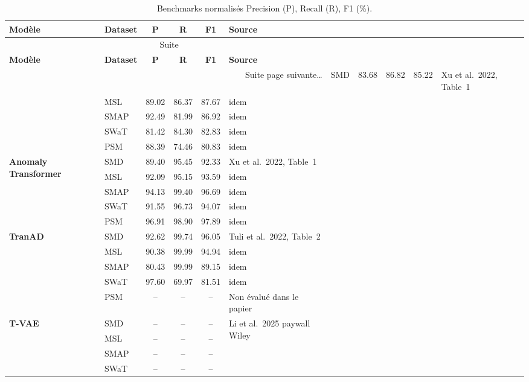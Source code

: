 \documentclass[12pt,a4paper]{article}
\newcommand{\nd}{--}
\begin{document}
\begin{landscape}
\begin{longtable}{llcccl}
\caption{Benchmarks normalisés  Precision (P), Recall (R), F1 (\%).}
\label{tab:benchmarks}\\
\toprule
\textbf{Modèle} & \textbf{Dataset} & \textbf{P} & \textbf{R} &
\textbf{F1} & \textbf{Source} \\
\midrule
\endfirsthead
\multicolumn{6}{c}{\tablename~\thetable{}  Suite}\\
\toprule
\textbf{Modèle} & \textbf{Dataset} & \textbf{P} & \textbf{R} &
\textbf{F1} & \textbf{Source} \\
\midrule
\endhead
\midrule\multicolumn{6}{r}{Suite page suivante\ldots}\endfoot
\bottomrule\endlastfoot

\multirow{5}{*}{\textbf{OmniAnomaly}}
 & SMD  & 83.68 & 86.82 & 85.22 & Xu et al.\ 2022, Table~1 \\
 & MSL  & 89.02 & 86.37 & 87.67 & idem \\
 & SMAP & 92.49 & 81.99 & 86.92 & idem \\
 & SWaT & 81.42 & 84.30 & 82.83 & idem \\
 & PSM  & 88.39 & 74.46 & 80.83 & idem \\
\midrule
\multirow{5}{*}{\textbf{Anomaly Transformer}}
 & SMD  & 89.40 & 95.45 & 92.33 & Xu et al.\ 2022, Table~1 \\
 & MSL  & 92.09 & 95.15 & 93.59 & idem \\
 & SMAP & 94.13 & 99.40 & 96.69 & idem \\
 & SWaT & 91.55 & 96.73 & 94.07 & idem \\
 & PSM  & 96.91 & 98.90 & 97.89 & idem \\
\midrule
\multirow{5}{*}{\textbf{TranAD}}
 & SMD  & 92.62 & 99.74 & 96.05 & Tuli et al.\ 2022, Table~2 \\
 & MSL  & 90.38 & 99.99 & 94.94 & idem \\
 & SMAP & 80.43 & 99.99 & 89.15 & idem \\
 & SWaT & 97.60 & 69.97 & 81.51 & idem \\
 & PSM  & \nd   & \nd   & \nd   & Non évalué dans le papier \\
\midrule
\multirow{5}{*}{\textbf{T-VAE}}
 & SMD  & \nd & \nd & \nd &
   \multirow{5}{*}{Li et al.\ 2025  paywall Wiley} \\
 & MSL  & \nd & \nd & \nd & \\
 & SMAP & \nd & \nd & \nd & \\
 & SWaT & \nd & \nd & \nd & \\

\end{longtable}
\end{landscape}
\end{document}
